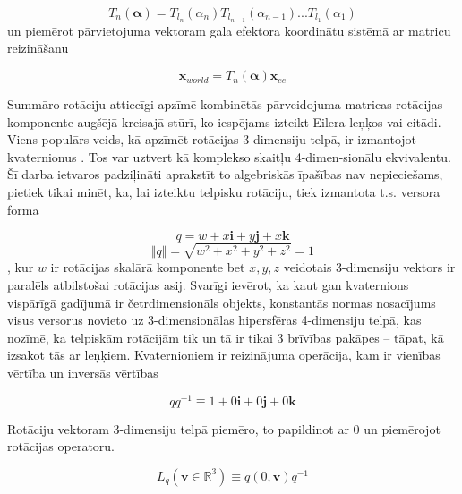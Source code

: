 \documentclass[12pt, a4paper]{article}
\numberwithin{equation}{section} %
\begin{document}
\begin{equation}
    T_{n}(\boldsymbol{\alpha}) = T_{l_n}(\alpha_n)T_{l_{n-1}}(\alpha_{n-1})...T_{l_{1}}(\alpha_{1})
\end{equation}
un piemērot pārvietojuma vektoram gala efektora koordinātu sistēmā ar matricu reizināšanu

\begin{equation}
    \boldsymbol{x}_{world} = T_{n}(\boldsymbol{\alpha})\boldsymbol{x}_{ee}
\end{equation}

Summāro rotāciju attiecīgi apzīmē kombinētās pārveidojuma matricas rotācijas \newline komponente augšējā kreisajā stūrī, ko iespējams izteikt Eilera leņķos vai citādi. Viens populārs veids, kā apzīmēt rotācijas 3-dimensiju telpā, ir izmantojot kvaternionus \cite{quaternions_illinois}. Tos var uztvert kā komplekso skaitļu 4-dimen-sionālu ekvivalentu. Šī darba ietvaros padziļināti aprakstīt to algebriskās īpašības nav nepieciešams, pietiek tikai minēt, ka, lai izteiktu telpisku rotāciju, tiek izmantota t.s. versora forma

\begin{equation}
    q = w + x\boldsymbol{i} + y\boldsymbol{j} + x\boldsymbol{k}
\end{equation}
\begin{equation}
    \Vert q \Vert = \sqrt{w^2 + x^2 + y^2 + z^2} = 1
\end{equation}
, kur $w$ ir rotācijas skalārā komponente bet $x,y,z$ veidotais 3-dimensiju vektors ir paralēls atbilstošai rotācijas asij. Svarīgi ievērot, ka kaut gan kvaternions vispārīgā gadījumā ir četrdimensionāls objekts, konstantās normas nosacījums visus versorus novieto uz 3-dimensionālas hipersfēras 4-dimensiju telpā, kas nozīmē, ka telpiskām rotācijām tik un tā ir tikai 3 brīvības pakāpes -- tāpat, kā izsakot tās ar leņķiem. Kvaternioniem ir reizinājuma operācija, kam ir vienības vērtība un inversās vērtības

\begin{equation}
    qq^{-1} \equiv 1 +  0\boldsymbol{i} + 0\boldsymbol{j} + 0\boldsymbol{k}
\end{equation}

Rotāciju vektoram 3-dimensiju telpā piemēro, to papildinot ar 0 un piemērojot rotācijas operatoru.

\begin{equation}
    L_q(\boldsymbol{v} \in \mathbb{R}^3) \equiv q(0,\boldsymbol{v})q^{-1}
\end{equation}
\end{document}
